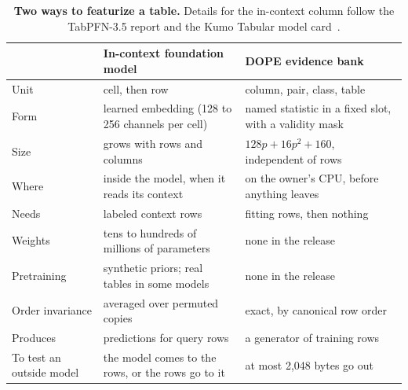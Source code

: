 \documentclass[10pt,letterpaper,twocolumn]{article}
\newcommand{\ct}[1]{{\bfseries\color{ink}#1}}   %
\newcommand{\tablefont}{\fontsize{8.1}{10.2}\selectfont}
\newcommand{\thd}[1]{{\sffamily\bfseries\fontsize{7.2}{9}\selectfont\color{ink}#1}}  %
\begin{document}
\begin{table}[t]
\caption{\ct{Two ways to featurize a table.} Details for the in-context column follow the TabPFN-3.5 report and the Kumo Tabular model card~\cite{tabpfn35,kumotabular}.}\label{tab:fm}
\tablefont
\begin{tabularx}{\columnwidth}{@{}L{1.52cm}L{3.0cm}Y@{}}
\toprule
 & \thd{In-context foundation model} & \thd{DOPE evidence bank}\\
\midrule
Unit & cell, then row & column, pair, class, table\\
Form & learned embedding (128 to 256 channels per cell) & named statistic in a fixed slot, with a validity mask\\
Size & grows with rows and columns & $128p+16p^2+160$, independent of rows\\
Where & inside the model, when it reads its context & on the owner's CPU, before anything leaves\\
Needs & labeled context rows & fitting rows, then nothing\\
Weights & tens to hundreds of millions of parameters & none in the release\\
Pretraining & synthetic priors; real tables in some models & none in the release\\
Order invariance & averaged over permuted copies & exact, by canonical row order\\
Produces & predictions for query rows & a generator of training rows\\
To test an outside model & the model comes to the rows, or the rows go to it & at most 2,048 bytes go out\\
\bottomrule
\end{tabularx}
\end{table}
\end{document}

